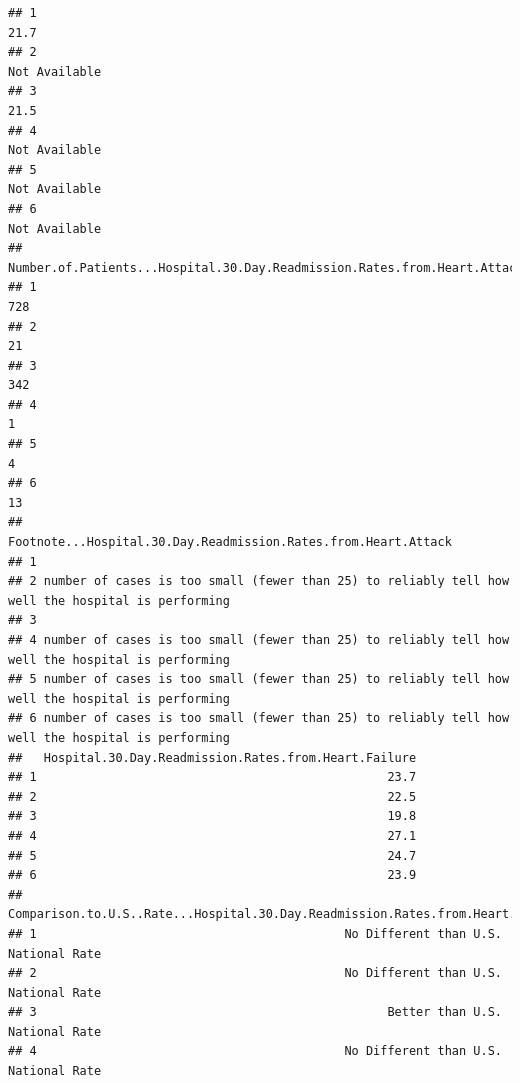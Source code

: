 \documentclass[
]{article}
\begin{document}
\begin{verbatim}
## 1                                                                             21.7
## 2                                                                    Not Available
## 3                                                                             21.5
## 4                                                                    Not Available
## 5                                                                    Not Available
## 6                                                                    Not Available
##   Number.of.Patients...Hospital.30.Day.Readmission.Rates.from.Heart.Attack
## 1                                                                      728
## 2                                                                       21
## 3                                                                      342
## 4                                                                        1
## 5                                                                        4
## 6                                                                       13
##                                      Footnote...Hospital.30.Day.Readmission.Rates.from.Heart.Attack
## 1                                                                                                  
## 2 number of cases is too small (fewer than 25) to reliably tell how well the hospital is performing
## 3                                                                                                  
## 4 number of cases is too small (fewer than 25) to reliably tell how well the hospital is performing
## 5 number of cases is too small (fewer than 25) to reliably tell how well the hospital is performing
## 6 number of cases is too small (fewer than 25) to reliably tell how well the hospital is performing
##   Hospital.30.Day.Readmission.Rates.from.Heart.Failure
## 1                                                 23.7
## 2                                                 22.5
## 3                                                 19.8
## 4                                                 27.1
## 5                                                 24.7
## 6                                                 23.9
##   Comparison.to.U.S..Rate...Hospital.30.Day.Readmission.Rates.from.Heart.Failure
## 1                                           No Different than U.S. National Rate
## 2                                           No Different than U.S. National Rate
## 3                                                 Better than U.S. National Rate
## 4                                           No Different than U.S. National Rate

\end{verbatim}
\end{document}
